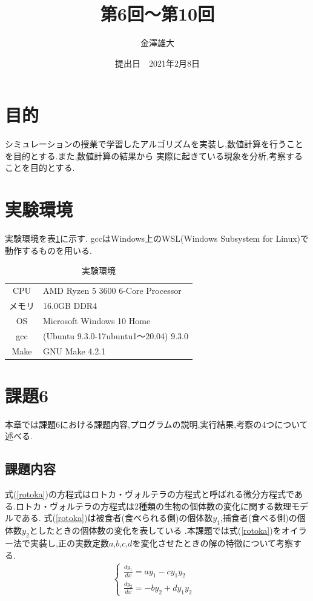 \documentclass[a4j]{jarticle}
\title{第6回～第10回}
\date{提出日　2021年2月8日}
\author{金澤雄大}
\begin{document}
    \maketitle
    \thispagestyle{empty}
    \clearpage
    \addtocounter{page}{-1}

    \section{目的}
    シミュレーションの授業で学習したアルゴリズムを実装し,数値計算を行うことを目的とする.また,数値計算の結果から
    実際に起きている現象を分析,考察することを目的とする.

    \section{実験環境}
      実験環境を表\ref{env}に示す. gccはWindows上のWSL(Windows Subsystem for Linux)で動作するものを用いる.
      \begin{table}[H]
        \caption{実験環境}
      \label{env}
      \begin{center}
          \begin{tabular}{c|l}\hline
            CPU & AMD Ryzen 5 3600 6-Core Processor \\ 
            メモリ & 16.0GB DDR4 \\
            OS & Microsoft Windows 10 Home \\
            gcc & (Ubuntu 9.3.0-17ubuntu1～20.04) 9.3.0 \\
            Make & GNU Make 4.2.1 \\ \hline
          \end{tabular}
      \end{center}
      \end{table}

      \section{課題6}
      本章では課題6における課題内容,プログラムの説明,実行結果,考察の4つについて述べる.
      \subsection{課題内容}
      式(\ref{rotoka})の方程式はロトカ・ヴォルテラの方程式と呼ばれる微分方程式である.ロトカ・ヴォルテラの方程式は2種類の生物の個体数の変化に関する数理モデルである.
      式(\ref{rotoka})は被食者(食べられる側)の個体数$y_1$,捕食者(食べる側)の個体数$y_2$としたときの個体数の変化を表している
      .本課題では式(\ref{rotoka})をオイラー法で実装し,正の実数定数$a$,$b$,$c$,$d$を変化させたときの解の特徴について考察する.
      \begin{eqnarray}
      \begin{cases}
        \frac{dy_1}{dx} = ay_1-cy_1y_2 & \\
        \frac{dy_2}{dx} = -by_2+dy_1y_2 &
      \end{cases}
      \label{rotoka}
    \end{eqnarray}
\end{document}
